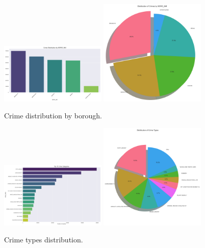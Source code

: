 \documentclass{article}
\begin{document}
\begin{figure}[H]
\centering
\includegraphics[width=0.45\textwidth]{crime_location_bar_chart_BORO_NM.png}
\hfill
\includegraphics[width=0.45\textwidth]{crime_location_pie_chart_BORO_NM.png}
\caption{Crime distribution by borough.}
\end{figure}

\begin{figure}[H]
\centering
\includegraphics[width=0.45\textwidth]{crime_types_bar_chart.png}\hfill
\includegraphics[width=0.45\textwidth]{crime_types_pie_chart.png}
\caption{Crime types distribution.}
\end{figure}
\end{document}
